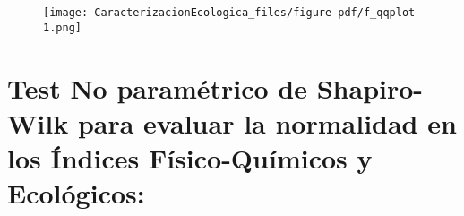 \documentclass[
  10pt,
  letterpaper,
  DIV=11,
  numbers=noendperiod]{scrreprt}
\begin{document}
\begin{figure}[tb]

{\centering \texttt{[image: CaracterizacionEcologica\_files/figure-pdf/f\_qqplot-1.png]}

}

\end{figure}

\hypertarget{test-no-paramuxe9trico-de-shapiro-wilk-para-evaluar-la-normalidad-en-los-uxedndices-fuxedsico-quuxedmicos-y-ecoluxf3gicos}{%
\section{\texorpdfstring{Test No paramétrico de \textbf{Shapiro-Wilk}
para evaluar la normalidad en los Índices Físico-Químicos y
Ecológicos:}{Test No paramétrico de Shapiro-Wilk para evaluar la normalidad en los Índices Físico-Químicos y Ecológicos:}}\label{test-no-paramuxe9trico-de-shapiro-wilk-para-evaluar-la-normalidad-en-los-uxedndices-fuxedsico-quuxedmicos-y-ecoluxf3gicos}}
\end{document}
